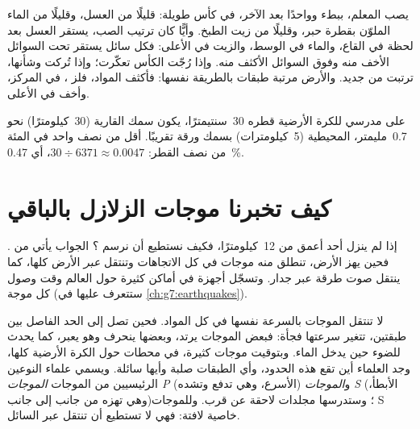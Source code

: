 \begin{inthelab}
يصب المعلم، ببطء وواحدًا بعد الآخر، في كأس طويلة:
قليلًا من العسل، وقليلًا من الماء الملوّن بقطرة حبر، وقليلًا من زيت الطبخ.
وأيًّا كان ترتيب الصب، يستقر العسل بعد لحظة في
القاع، والماء في الوسط، والزيت في الأعلى: فكل سائل يستقر
تحت السوائل الأخف منه وفوق السوائل الأكثف منه. وإذا رُجّت الكأس تعكّرت؛
وإذا تُركت وشأنها، ترتبت من جديد. والأرض مرتبة طبقات بالطريقة نفسها: فأكثف المواد، فلز ، في المركز، وأخف  في الأعلى.
\end{inthelab}


\begin{remark}\label{rem:g6:inside-the-earth:thin-crust}
على  مدرسي للكرة الأرضية قطره 30~سنتيمترًا، يكون سمك  القارية (30~كيلومترًا)
نحو 0.7~مليمتر،  المحيطية (5~كيلومترات) بسمك
ورقة تقريبًا.  أقل من نصف واحد في
المئة من نصف القطر: $30 \div 6371 \approx 0.0047$، أي 0.47~\%.
\end{remark}

\section{كيف تخبرنا موجات الزلازل بالباقي}\label{sec:g6:inside-the-earth:waves}

إذا لم ينزل أحد أعمق من 12~كيلومترًا، فكيف نستطيع أن نرسم ؟ الجواب
يأتي من . فحين يهز  الأرض، تنطلق منه موجات
في كل الاتجاهات وتنتقل \emph{عبر} الأرض كلها، كما ينتقل
صوت طرقة عبر جدار. وتسجّل أجهزة في أماكن كثيرة حول العالم وقت وصول كل موجة (ستتعرف عليها في
\cref{ch:g7:earthquakes}).

لا تنتقل الموجات بالسرعة نفسها في كل المواد. فحين
تصل إلى الحد الفاصل بين طبقتين، تتغير سرعتها فجأة: فبعض
الموجات يرتد، وبعضها ينحرف وهو يعبر، كما يحدث للضوء حين يدخل
الماء. وبتوقيت موجات  كثيرة، في محطات حول الكرة الأرضية كلها، وجد العلماء أين تقع هذه الحدود،
وأي الطبقات صلبة وأيها سائلة. ويسمي علماء  النوعين الرئيسيين من
الموجات \emph{الموجات P} (الأسرع، وهي تدفع  وتشده)
و\emph{الموجات S} (الأبطأ، وهي تهزه من جانب إلى جانب)؛ وستدرسها
مجلدات لاحقة عن قرب. وللموجات S خاصية لافتة: فهي
لا تستطيع أن تنتقل عبر السائل.

